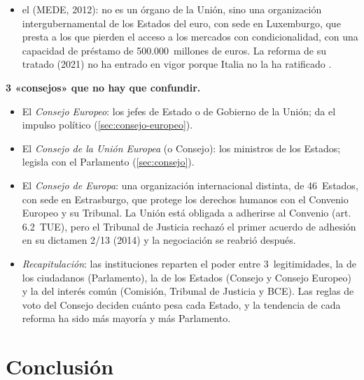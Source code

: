 \documentclass[11pt]{article}
\begin{document}
\begin{itemize}
\begin{itemize}
  \item el  (MEDE, 2012): no es un órgano de la Unión, sino una organización intergubernamental de los Estados del euro, con sede en Luxemburgo, que presta a los que pierden el acceso a los mercados con condicionalidad, con una capacidad de préstamo de 500.000~millones de euros. La reforma de su tratado (2021) no ha entrado en vigor porque Italia no la ha ratificado .
  \end{itemize}
\end{itemize}

\begin{anotaciones}
\textbf{3 «consejos» que no hay que confundir.}
\begin{itemize}
\item El \emph{Consejo Europeo}: los jefes de Estado o de Gobierno de la Unión; da el impulso político (\ref{sec:consejo-europeo}).
\item El \emph{Consejo de la Unión Europea} (o Consejo): los ministros de los Estados; legisla con el Parlamento (\ref{sec:consejo}).
\item El \emph{Consejo de Europa}: una organización internacional distinta, de 46~Estados, con sede en Estrasburgo, que protege los derechos humanos con el Convenio Europeo y su Tribunal. La Unión está obligada a adherirse al Convenio (art. 6.2~TUE), pero el Tribunal de Justicia rechazó el primer acuerdo de adhesión en su dictamen 2/13 (2014) y la negociación se reabrió después.
\end{itemize}
\end{anotaciones}

\begin{itemize}
\item \emph{Recapitulación}: las instituciones reparten el poder entre 3~legitimidades, la de los ciudadanos (Parlamento), la de los Estados (Consejo y Consejo Europeo) y la del interés común (Comisión, Tribunal de Justicia y BCE). Las reglas de voto del Consejo deciden cuánto pesa cada Estado, y la tendencia de cada reforma ha sido más mayoría y más Parlamento.
\end{itemize}

\section*{Conclusión}
\end{document}
